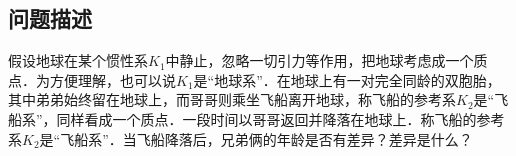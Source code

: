 

\subsection{问题描述}

假设地球在某个惯性系$K_1$中静止，忽略一切引力等作用，把地球考虑成一个质点．为方便理解，也可以说$K_1$是“地球系”．在地球上有一对完全同龄的双胞胎，其中弟弟始终留在地球上，而哥哥则乘坐飞船离开地球，称飞船的参考系$K_2$是“飞船系”，同样看成一个质点．一段时间以哥哥返回并降落在地球上．称飞船的参考系$K_2$是“飞船系”．当飞船降落后，兄弟俩的年龄是否有差异？差异是什么？







